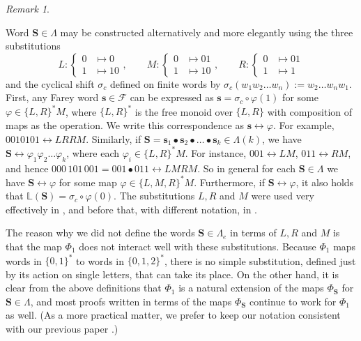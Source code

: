 \documentclass[12pt]{amsart}
\theoremstyle{definition}
\theoremstyle{remark}
\newtheorem{remark}[theorem]{Remark}
\numberwithin{equation}{section}
\renewcommand{\L}{\ensuremath{\mathbb{L}}}
\newcommand{\cF}{\mathcal{F}}
\newcommand{\s}{ {\mathbf{s}}}
\newcommand{\cs}{ {\mathbf{S}}}
\newcommand{\si}{\sigma}
\newcommand{\La}{\Lambda}
\begin{document}
{\begin{remark} \label{rem:LMR-substitutions}
{\rm
Word $\cs\in\Lambda$ may be constructed alternatively and more elegantly using the three substitutions
\begin{equation} \label{eq:LMR}
L: \begin{cases}0 &\mapsto 0\\ 1 &\mapsto 10\end{cases}, \qquad
M: \begin{cases}0 &\mapsto 01\\ 1 &\mapsto 10\end{cases}, \qquad
R: \begin{cases}0 &\mapsto 01\\ 1 &\mapsto 1\end{cases}
\end{equation}
and the cyclical shift $\sigma_c$ defined on finite words by $\si_c(w_1w_2\dots w_n):=w_2\dots w_nw_1$. First, any Farey word $\s\in\cF$ can be expressed as $\s=\si_c\circ \varphi(1)$ for some $\varphi\in\{L,R\}^*M$, where $\{L,R\}^*$ is the free monoid over $\{L,R\}$ with composition of maps as the operation. We write this correspondence as $\s\leftrightarrow \varphi$. For example, $0010101 \leftrightarrow LRRM$. Similarly, if $\cs=\s_1\bullet\s_2\bullet\dots\bullet\s_k\in\La(k)$, we have $\cs \leftrightarrow \varphi_1\varphi_2\dots\varphi_k$, where each $\varphi_i\in \{L,R\}^*M$. For instance, $001\leftrightarrow  LM$, $011\leftrightarrow RM$, and hence $000\,101\,001=001\bullet 011 \leftrightarrow  LMRM$. So in general for each $\cs\in\La$ we have $\cs\leftrightarrow \varphi$ for some map $\varphi\in\{L,M,R\}^*M$. Furthermore, if $\cs\leftrightarrow \varphi$, it also holds that $\L(\cs)=\si_c\circ\varphi(0)$.
The substitutions $L, R$ and $M$ were used very effectively in \cite{Komornik-Steiner-Zou-2024}, and before that, with different notation, in \cite{Labarca-Moreira-2006}.

The reason why we did not define the words $\cs\in\La_e$ in terms of $L, R$ and $M$ is that the map $\Phi_1$ does not interact well with these substitutions. Because $\Phi_1$ maps words in $\{0,1\}^*$ to words in $\{0,1,2\}^*$, there is no simple substitution, defined just by its action on single letters, that can take its place. On the other hand, it is clear from the above definitions that $\Phi_1$ is a natural extension of the maps $\Phi_\cs$ for $\cs\in\Lambda$, and most proofs written in terms of the maps $\Phi_\cs$ continue to work for $\Phi_1$ as well. (As a more practical matter, we prefer to keep our notation consistent with our previous paper \cite{Allaart-Kong-2021}.)
}
\end{remark}


}
\end{document}
